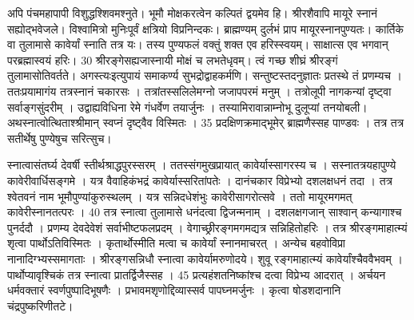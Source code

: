 अपि पंचमहापापी विशुद्धश्शिवमश्नुते।
 भूमौ मोक्षकरत्वेन कल्पितं द्वयमेव हि।
 श्रीरशैवापि मायूरे स्नानं सह्योद्भवेजले।
 विश्वामित्रो मुनिःपूर्वं क्षत्रियो विप्रनिन्दकः।
 ब्राह्मण्यम् दुर्लभं प्राप मायूरस्नानपुण्यतः।
 कार्तिके वा तुलामासे कावेर्यां स्नाति तत्र यः।
 तस्य पुण्यफलं वक्तुं शक्त एव हरिस्स्वयम्।
 साक्षात्स एव भगवान् परब्रह्मास्वयं हरिः।
 30 श्रीरङ्गेसह्यजास्नायी मोक्षं च लभतेधृवम्।
 त्वं गच्छ शीघ्रं श्रीरङ्गं तुलामासोतिवर्तते।
 अगस्त्यःइत्युपायं समाकर्ण्य सुभद्रोद्वाहकर्मणि।
 सन्तुष्टस्तदनुज्ञातः प्रतस्थे तं प्रणम्यच ।
 ततःप्रयामागंय तत्रस्नानं चकारसः ।
 तत्रांतस्सलिलेमग्नो जजापपरमं मनुम् ।
 तत्रोलूपी नागकन्यां दृष्ट्वा सर्वाङ्गसुंदरीम् ।
 उद्वाह्यविधिना रेमे गंधर्वेण तयार्जुनः ।
 तस्यामिरावान्नाम्नोभू दुलूप्यां तनयोबली।
 अथस्नात्वोत्थिताश्श्रीमान् स्वप्नं दृष्ट्वैव विस्मितः ।
 35 प्रदक्षिणक्रमाद्भूमेर् ब्राह्मणैस्सह पाण्डवः ।
 तत्र तत्र सतीर्थेषु पुण्येषुच सरित्सुच।
 
स्नात्वासंतर्घ्य देवर्षी स्तीर्थश्राद्धपुरस्सरम् ।
 ततस्संगमुखप्रायात् कावेर्यास्सागरस्य च ।
 सस्नातत्रयहापुण्ये कावेरीवार्धिसङ्गमे ।
 यत्र वैवाहिकंभद्रं कावेर्यास्सरितांपतेः ।
 दानंचकार विप्रेभ्यो दशलक्षधनं तदा ।
 तत्र श्वेतवनं नाम भूमौपुण्यांकुरुस्थलम् ।
 यत्र सन्निदधेशंभुः कावेरीसागरोत्सवे ।
 ततो मायूरमगमत् कावेरीस्नानतत्परः ।
 40 तत्र स्नात्वा तुलामासे धनंदत्वा द्विजन्मनाम् ।
 दशलक्षगजान् साश्वान् कन्यागाश्च पुनर्ददौ ।
 प्रणम्य देवदेवेशं सर्वाभीष्टफलप्रदम् ।
 वेगाच्छ्रीरङ्गमगमद्यत्र सन्निहितोहरिः ।
 तत्र श्रीरङ्गमाहात्म्यं शृत्वा पार्थोऽतिविस्मितः ।
 कृतार्थोस्मीति मत्वा च कावेर्यां स्नानमाचरत् ।
 अन्येच बहवोविप्रा नानादिग्भ्यस्समागताः ।
 श्रीरङ्गसन्निधौ स्नात्वा कावेर्यामरुणोदये।
 शुवू रङ्गमाहात्म्यं कावेर्यांश्चैववैभवम् ।
 पार्थोप्यावृश्चिकं तत्र स्नात्वा प्रातर्द्विजैस्सह ।
 45 प्रत्यहंशतनिष्कांश्च दत्वा विप्रेभ्य आदरात् ।
 अर्चयन धर्मवक्तारं स्वर्णपुष्पादिभूषणैः ।
 प्रभावमशृणोद्दिव्यास्सर्व पापघ्नमर्जुनः ।
 कृत्वा षोडशदानानि चंद्रपुष्करिणीतटे।
 
